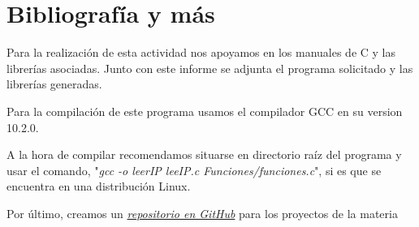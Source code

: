 \documentclass[12pt,a4paper]{article} %
\begin{document}
\section{Bibliografía y más}
Para la realización de esta actividad nos apoyamos en los manuales de C y las librerías asociadas. Junto con este informe se adjunta el programa solicitado y las librerías generadas.\par 
Para la compilación de este programa usamos el compilador GCC en su version 10.2.0.\par
 A la hora de compilar recomendamos situarse en directorio raíz del programa y usar el comando, "\textit{gcc -o leerIP leeIP.c Funciones/funciones.c}", si es que se encuentra en una distribución Linux.\par
 Por último, creamos un \href{https://github.com/LucaPicc/SOyR}{\textit{repositorio en GitHub}} para los proyectos de la materia
\end{document}
